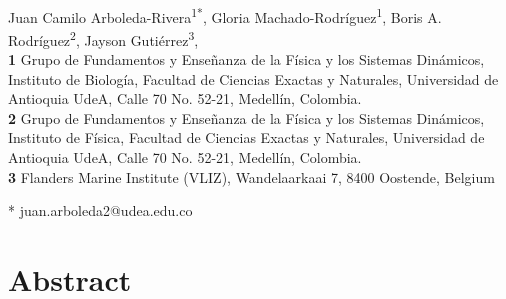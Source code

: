 \documentclass[10pt,letterpaper]{article}
\date{}
\begin{document}
\vspace*{0.2in}

\begin{flushleft}
{\Large
\textbf{}
}
\newline
\\
Juan Camilo Arboleda-Rivera\textsuperscript{1*},
Gloria Machado-Rodríguez\textsuperscript{1},
Boris A. Rodríguez\textsuperscript{2},
Jayson Gutiérrez\textsuperscript{3},
\\
\bigskip
\textbf{1} Grupo de Fundamentos y Enseñanza de la Física y los Sistemas Dinámicos,
Instituto de Biología, Facultad de Ciencias Exactas y Naturales, Universidad de Antioquia
UdeA, Calle 70 No. 52-21, Medellín, Colombia.
\\
\textbf{2} Grupo de Fundamentos y Enseñanza de la Física y los Sistemas Dinámicos,
Instituto de Física, Facultad de Ciencias Exactas y Naturales, Universidad de Antioquia
UdeA, Calle 70 No. 52-21, Medellín, Colombia.
\\
\textbf{3} Flanders Marine Institute (VLIZ), Wandelaarkaai 7, 8400 Oostende,
Belgium
\\
\bigskip

* juan.arboleda2@udea.edu.co

\end{flushleft}
\section*{Abstract}
\end{document}
